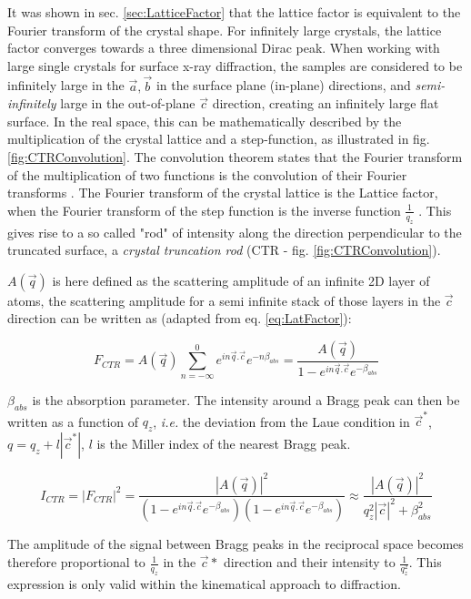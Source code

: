 It was shown in sec. \ref{sec:LatticeFactor} that the lattice factor is equivalent to the Fourier transform of the crystal shape.
For infinitely large crystals, the lattice factor converges towards a three dimensional Dirac peak.
When working with large single crystals for surface x-ray diffraction, the samples are considered to be infinitely large in the $\vec{a}, \vec{b}$ in the surface plane (in-plane) directions, and \textit{semi-infinitely} large in the out-of-plane $\vec{c}$ direction, creating an infinitely large flat surface.
In the real space, this can be mathematically described by the multiplication of the crystal lattice and a step-function, as illustrated in fig. \ref{fig:CTRConvolution}.
The convolution theorem states that the Fourier transform of the multiplication of two functions is the convolution of their Fourier transforms \parencite{Mcalister2003}.
The Fourier transform of the crystal lattice is the Lattice factor, when the Fourier transform of the step function is the inverse function $\frac{1}{q_z}$ \parencite{Andrews1985, Robinson1986}.
This gives rise to a so called "rod" of intensity along the direction perpendicular to the truncated surface, a \textit{crystal truncation rod} (CTR - fig. \ref{fig:CTRConvolution}).

$A(\vec{q})$ is here defined as the scattering amplitude of an infinite 2D layer of atoms, the scattering amplitude for a semi infinite stack of those layers in the $\vec{c}$ direction can be written as (adapted from eq. \ref{eq:LatFactor}):

\begin{equation}
    \label{eq:CTR1}
    F_{CTR} = A(\vec{q})\sum_{n=-\infty}^0 e^{in\vec{q}.\vec{c}} e^{-n\beta_{abs}} = \frac{A(\vec{q})}{1 - e^{in\vec{q}.\vec{c}} e^{-\beta_{abs}}}
\end{equation}

$\beta_{abs}$ is the absorption parameter.
The intensity around a Bragg peak can then be written as a function of $q_z$, \textit{i.e.} the deviation from the Laue condition in $\vec{c}^*$, $q = q_z + l|\vec{c}^*|$, $l$ is the Miller index of the nearest Bragg peak.

\begin{equation}
    \label{eq:CTR2}
    I_{CTR} = |F_{CTR}|^2 = \frac{|A(\vec{q})|^2}{(1 - e^{in\vec{q}.\vec{c}} e^{-\beta_{abs}})(1 - e^{in\vec{q}.\vec{c}} e^{-\beta_{abs}})} \approx \frac{|A(\vec{q})|^2}{q_z^2 |\vec{c}|^2 + \beta_{abs}^2 }
\end{equation}

The amplitude of the signal between Bragg peaks in the reciprocal space becomes therefore proportional to $\frac{1}{q_z}$ in the $\vec{c}*$ direction and their intensity to $\frac{1}{q_z^2}$.
This expression is only valid within the kinematical approach to diffraction.

